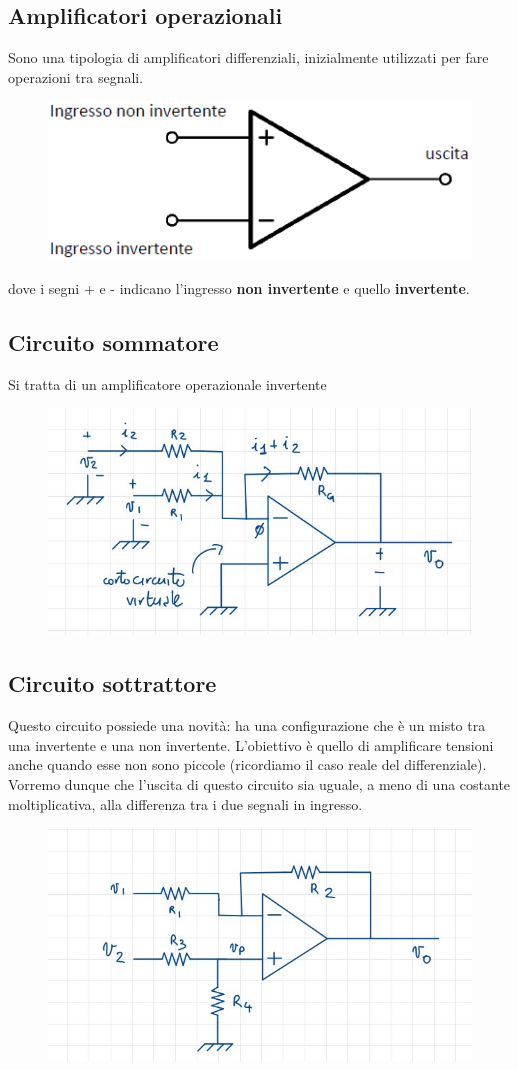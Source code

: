 \documentclass[11pt,a4paper,]{article}
\begin{document}
\subsection{Amplificatori operazionali}
Sono una tipologia di amplificatori differenziali, inizialmente utilizzati per fare operazioni tra segnali.
\begin{figure}
    \centering
    \includegraphics[width=0.4\linewidth]{img/amp op.png}
\end{figure}
dove i segni + e - indicano l'ingresso \textbf{non invertente} e quello \textbf{invertente}.

\subsection{Circuito sommatore}
Si tratta di un amplificatore operazionale invertente
\begin{figure}[H]   
    \centering
    \includegraphics[width=0.5\linewidth]{img/circ somma.png}
\end{figure}
\subsection{Circuito sottrattore}
Questo circuito possiede una novità: ha una configurazione che è un misto tra una invertente e una non invertente. L'obiettivo è quello di amplificare tensioni anche quando esse non sono piccole (ricordiamo il caso reale del differenziale). Vorremo dunque che l'uscita di questo circuito sia uguale, a meno di una costante moltiplicativa, alla differenza tra i due segnali in ingresso.
\begin{figure}[H]
    \centering
    \includegraphics[width=0.5\linewidth]{img/circ sott.png}
\end{figure}
\end{document}
